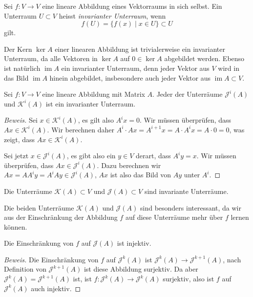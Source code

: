 \begin{definition}
\label{buch:eigenwerte:def:invarianter-unterraum}
Sei $f\colon V\to V$ eine lineare Abbildung eines Vektorraums in sich
selbst.
Ein Unterraum $U\subset V$ heisst {\em invarianter Unterraum},
wenn
\[
f(U) = \{ f(x) \mid x\in U\} \subset U
\]
gilt.
%
%
\end{definition}

Der Kern $\ker A$ einer linearen Abbildung ist trivialerweise ein
invarianter Unterraum, da alle Vektoren in $\ker A$ auf $0\in\ker A$
abgebildet werden.
Ebenso ist natürlich $\operatorname{im}A$ ein invarianter Unterraum,
denn jeder Vektor aus $V$ wird in das Bild $\operatorname{im}A$ hinein
abgebildet, insbesondere auch jeder Vektor aus $\operatorname{im}A\subset V$.

\begin{satz}
\label{buch:eigenwerte:satz:KJinvariant}
Sei $f\colon V\to V$ eine lineare Abbildung mit Matrix $A$.
Jeder der Unterräume $\mathcal{J}^i(A)$ und $\mathcal{K}^i(A)$ 
ist ein invarianter Unterraum.
\end{satz}

\begin{proof}[Beweis]
Sei $x\in\mathcal{K}^i(A)$, es gilt also $A^ix=0$.
Wir müssen überprüfen, dass $Ax\in\mathcal{K}^i(A)$.
Wir berechnen daher $A^i\cdot Ax=A^{i+1}x=A\cdot A^ix = A\cdot 0=0$,
was zeigt, dass $Ax\in\mathcal{K}^i(A)$.

Sei jetzt $x\in\mathcal{J}^i(A)$, es gibt also ein $y\in V$ derart, dass
$A^iy=x$.
Wir müssen überprüfen, dass $Ax\in\mathcal{J}^i(A)$.
Dazu berechnen wir $Ax=AA^iy=A^iAy\in\mathcal{J}^i(A)$, $Ax$ ist also das
Bild von $Ay$ unter $A^i$.
\end{proof}

\begin{korollar}
Die Unterräume $\mathcal{K}(A)\subset V$ und $\mathcal{J}(A)\subset V$
sind invariante Unterräume.
\end{korollar}

Die beiden Unterräume $\mathcal{K}(A)$ und $\mathcal{J}(A)$ sind besonders
interessant, da wir aus der Einschränkung der Abbildung $f$ auf diese
Unterräume mehr über $f$ lernen können.

\begin{satz}
\label{buch:eigenwerte:satz:fJinj}
Die Einschränkung von $f$ auf $\mathcal{J}(A)$ ist injektiv.
\end{satz}

\begin{proof}[Beweis]
Die Einschränkung von $f$ auf $\mathcal{J}^k(A)$ ist
$\mathcal{J}^k(A) \to \mathcal{J}^{k+1}(A)$, nach Definition von
$\mathcal{J}^{k+1}(A)$ ist diese Abbildung surjektiv.
Da aber $\mathcal{J}^k(A)=\mathcal{J}^{k+1}(A)$ ist, ist
$f\colon \mathcal{J}^k(A)\to\mathcal{J}^k(A)$ surjektiv,
also ist $f$ auf $\mathcal{J}^k(A)$ auch injektiv.
\end{proof}


